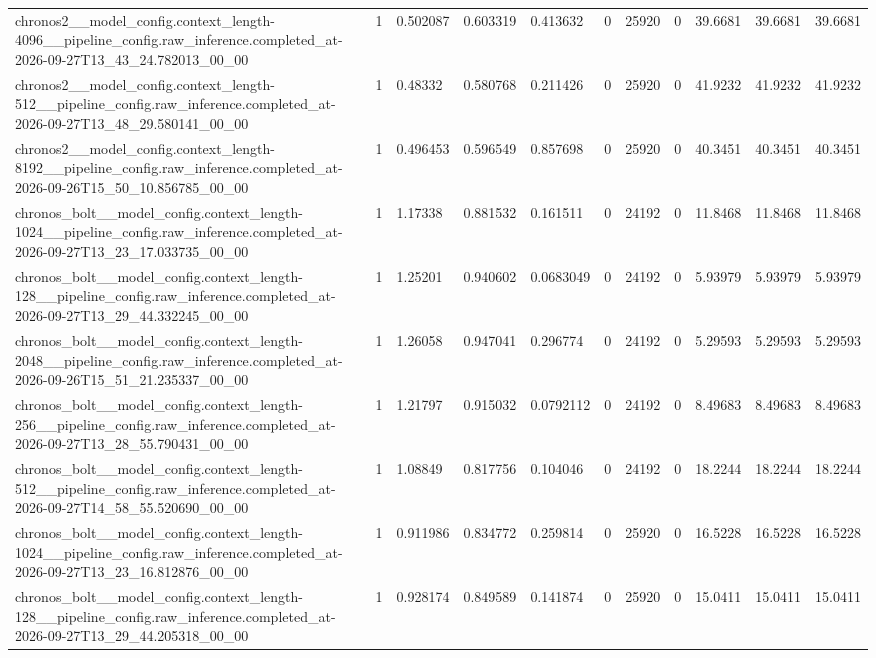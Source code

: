 \begin{tabular}{lllllllllll}
chronos2\_\_model\_config.context\_length-4096\_\_pipeline\_config.raw\_inference.completed\_at-2026-09-27T13\_43\_24.782013\_00\_00 & 1 & 0.502087 & 0.603319 & 0.413632 & 0 & 25920 & 0 & 39.6681 & 39.6681 & 39.6681 \\
chronos2\_\_model\_config.context\_length-512\_\_pipeline\_config.raw\_inference.completed\_at-2026-09-27T13\_48\_29.580141\_00\_00 & 1 & 0.48332 & 0.580768 & 0.211426 & 0 & 25920 & 0 & 41.9232 & 41.9232 & 41.9232 \\
chronos2\_\_model\_config.context\_length-8192\_\_pipeline\_config.raw\_inference.completed\_at-2026-09-26T15\_50\_10.856785\_00\_00 & 1 & 0.496453 & 0.596549 & 0.857698 & 0 & 25920 & 0 & 40.3451 & 40.3451 & 40.3451 \\
chronos\_bolt\_\_model\_config.context\_length-1024\_\_pipeline\_config.raw\_inference.completed\_at-2026-09-27T13\_23\_17.033735\_00\_00 & 1 & 1.17338 & 0.881532 & 0.161511 & 0 & 24192 & 0 & 11.8468 & 11.8468 & 11.8468 \\
chronos\_bolt\_\_model\_config.context\_length-128\_\_pipeline\_config.raw\_inference.completed\_at-2026-09-27T13\_29\_44.332245\_00\_00 & 1 & 1.25201 & 0.940602 & 0.0683049 & 0 & 24192 & 0 & 5.93979 & 5.93979 & 5.93979 \\
chronos\_bolt\_\_model\_config.context\_length-2048\_\_pipeline\_config.raw\_inference.completed\_at-2026-09-26T15\_51\_21.235337\_00\_00 & 1 & 1.26058 & 0.947041 & 0.296774 & 0 & 24192 & 0 & 5.29593 & 5.29593 & 5.29593 \\
chronos\_bolt\_\_model\_config.context\_length-256\_\_pipeline\_config.raw\_inference.completed\_at-2026-09-27T13\_28\_55.790431\_00\_00 & 1 & 1.21797 & 0.915032 & 0.0792112 & 0 & 24192 & 0 & 8.49683 & 8.49683 & 8.49683 \\
chronos\_bolt\_\_model\_config.context\_length-512\_\_pipeline\_config.raw\_inference.completed\_at-2026-09-27T14\_58\_55.520690\_00\_00 & 1 & 1.08849 & 0.817756 & 0.104046 & 0 & 24192 & 0 & 18.2244 & 18.2244 & 18.2244 \\
chronos\_bolt\_\_model\_config.context\_length-1024\_\_pipeline\_config.raw\_inference.completed\_at-2026-09-27T13\_23\_16.812876\_00\_00 & 1 & 0.911986 & 0.834772 & 0.259814 & 0 & 25920 & 0 & 16.5228 & 16.5228 & 16.5228 \\
chronos\_bolt\_\_model\_config.context\_length-128\_\_pipeline\_config.raw\_inference.completed\_at-2026-09-27T13\_29\_44.205318\_00\_00 & 1 & 0.928174 & 0.849589 & 0.141874 & 0 & 25920 & 0 & 15.0411 & 15.0411 & 15.0411 \\

\end{tabular}
